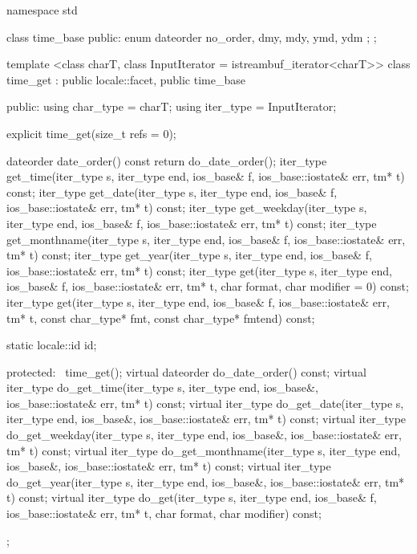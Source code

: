 \begin{codeblock}
namespace std {
  class time_base {
  public:
    enum dateorder { no_order, dmy, mdy, ymd, ydm };
  };

  template <class charT, class InputIterator = istreambuf_iterator<charT>>
  class time_get : public locale::facet, public time_base {
  public:
    using char_type = charT;
    using iter_type = InputIterator;

    explicit time_get(size_t refs = 0);

    dateorder date_order()  const { return do_date_order(); }
    iter_type get_time(iter_type s, iter_type end, ios_base& f,
                       ios_base::iostate& err, tm* t)  const;
    iter_type get_date(iter_type s, iter_type end, ios_base& f,
                       ios_base::iostate& err, tm* t)  const;
    iter_type get_weekday(iter_type s, iter_type end, ios_base& f,
                       ios_base::iostate& err, tm* t) const;
    iter_type get_monthname(iter_type s, iter_type end, ios_base& f,
                       ios_base::iostate& err, tm* t) const;
    iter_type get_year(iter_type s, iter_type end, ios_base& f,
                       ios_base::iostate& err, tm* t) const;
    iter_type get(iter_type s, iter_type end, ios_base& f,
                       ios_base::iostate& err, tm* t, char format, char modifier = 0) const;
    iter_type get(iter_type s, iter_type end, ios_base& f,
                       ios_base::iostate& err, tm* t, const char_type* fmt,
                       const char_type* fmtend) const;

    static locale::id id;

  protected:
    ~time_get();
    virtual dateorder do_date_order()  const;
    virtual iter_type do_get_time(iter_type s, iter_type end, ios_base&,
                                  ios_base::iostate& err, tm* t) const;
    virtual iter_type do_get_date(iter_type s, iter_type end, ios_base&,
                                  ios_base::iostate& err, tm* t) const;
    virtual iter_type do_get_weekday(iter_type s, iter_type end, ios_base&,
                                     ios_base::iostate& err, tm* t) const;
    virtual iter_type do_get_monthname(iter_type s, iter_type end, ios_base&,
                                       ios_base::iostate& err, tm* t) const;
    virtual iter_type do_get_year(iter_type s, iter_type end, ios_base&,
                                  ios_base::iostate& err, tm* t) const;
    virtual iter_type do_get(iter_type s, iter_type end, ios_base& f,
                             ios_base::iostate& err, tm* t, char format, char modifier) const;
  };
}
\end{codeblock}


